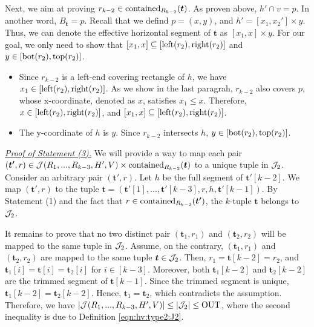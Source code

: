 \vgap 

Next, we aim at proving $r_{k-2}\in \mathrm{contained}_{R_{k-2}}(\textrm{\boldmath${t}$})$. As proven above, $h'\cap v= p$. In another word, $B_\bm{t} = p$. Recall that we defind $p = (x,y)$, and $h' = [x_1,x_2']\times y$. Thus, we can denote the effective horizontal segment of $\bm{t}$ as $[x_1, x] \times y$. For our goal, we only need to show that $[x_1,x] \subseteq [\mathrm{left}(r_2), \mathrm{right}(r_2)]$ and $y \in [\mathrm{bot}(r_2), \mathrm{top}(r_2)]$. 
\begin{itemize}
    \item Since $r_{k-2}$ is a left-end covering rectangle of $h$, we have  $x_1 \in [\mathrm{left}(r_2), \mathrm{right}(r_2)]$. As we show in the last paragrah, $r_{k-2}$ also covers $p$, whose x-coordinate, denoted as $x$, satisfies $x_1 \le x$. Therefore, $x \in [\mathrm{left}(r_2), \mathrm{right}(r_2)]$, and $[x_1,x] \subseteq [\mathrm{left}(r_2), \mathrm{right}(r_2)]$.
    \item The y-coordinate of $h$ is $y$. Since $r_{k-2}$ intersects $h$, $y \in [\mathrm{bot}(r_2), \mathrm{top}(r_2)]$.
\end{itemize}

\vgap 

\noindent \underline{\em Proof of Statement (3).}
We will provide a way to map each pair $(\textrm{\boldmath${t'}$}, r)\in \mathcal{J}(R_1,...,R_{k-3},H',V) \times \mathrm{contained}_{R_{k-2}}(\textrm{\boldmath${t}$})$ to a unique tuple in $\mathcal{J}_2$. Consider an arbitrary pair $(\bm{t'}, r)$. Let $h$ be the full segment of $\bm{t'}[k-2]$. We map $(\bm{t'}, r)$ to the tuple $\bm{t} = (\bm{t}'[1],...,\bm{t}'[k-3], r, h, \bm{t}'[k-1])$. By Statement (1) and the fact that $r\in \mathrm{contained}_{R_{k-2}}(\textrm{\boldmath${t'}$})$, the $k$-tuple $\bm{t}$ belongs to $\mathcal{J}_2$. 

\vgap 

It remains to prove that no two distinct pair $(\bm{t}_1, r_1)$ and $(\bm{t}_2, r_2)$ will be mapped to the same tuple in $\mathcal{J}_2$. Assume, on the contrary, $(\bm{t}_1, r_1)$ and $(\bm{t}_2, r_2)$ are mapped to the same tuple $\textrm{\boldmath${t}$} \in \mathcal{J}_2$. Then, $r_1 = \bm{t}[k-2] = r_2$, and $\bm{t}_1[i] = \bm{t}[i] = \bm{t}_2[i]$ for $i \in [k-3]$. Moreover, both $\bm{t}_1[k-2]$ and $\bm{t}_2[k-2]$ are the trimmed segment of $\bm{t}[k-1]$. Since the trimmed segment is unique, $\bm{t}_1[k-2] = \bm{t}_2[k-2]$. Hence, $\bm{t}_1 = \bm{t}_2$, which contradicts the assumption. Therefore, we have $|\mathcal{J}(R_1,...,R_{k-3},H',V)| \le |\mathcal{J}_2| \le \mathrm{OUT}$, where the second inequality is due to Definition \eqref{eqn:hv:type2:J2}.
